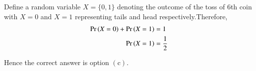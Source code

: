 Define a random variable $X=\{0,1\}$ denoting the outcome of the toss of 6th coin with $X=0$ and $X=1$ representing tails and head respectively.Therefore,
\begin{align}
\Pr\left(X=0\right) + \Pr\left(X=1\right) &= 1\\
\Pr\left(X=1\right) &= \frac{1}{2}
 \end{align}
 
Hence the correct answer is option $(\mathrm{c})$.